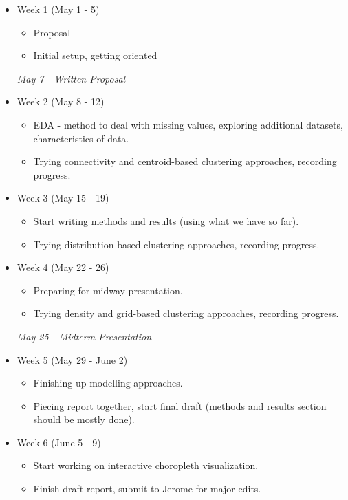 \documentclass[11pt, a4paper]{article}
\begin{document}
\begin{itemize}
\item Week 1  \dotfill (May 1 - 5)
\begin{itemize}
\item Proposal 
\item Initial setup, getting oriented
\end{itemize}

\textit{May 7 - Written Proposal}

\item Week 2  \dotfill (May 8 - 12)
\begin{itemize}
\item EDA - method to deal with missing values, exploring additional datasets, characteristics of data. 
\item Trying connectivity and centroid-based clustering approaches, recording progress. 
\end{itemize}

\item Week 3  \dotfill (May 15 - 19)
\begin{itemize}
\item Start writing methods and results (using what we have so far). 
\item Trying distribution-based clustering approaches, recording progress. 
\end{itemize}

\item Week 4  \dotfill (May 22 - 26)
\begin{itemize}
\item Preparing for midway presentation.
\item Trying density and grid-based clustering approaches, recording progress. 
\end{itemize}

\textit{May 25 - Midterm Presentation}

\item Week 5  \dotfill (May 29 - June 2)
\begin{itemize} 
\item Finishing up modelling approaches. 
\item Piecing report together, start final draft (methods and results section should be mostly done). 
\end{itemize}

\item Week 6  \dotfill (June 5 - 9)
\begin{itemize}
\item Start working on interactive choropleth visualization. 
\item Finish draft report, submit to Jerome for major edits. 
\end{itemize}


\end{itemize}
\end{document}
